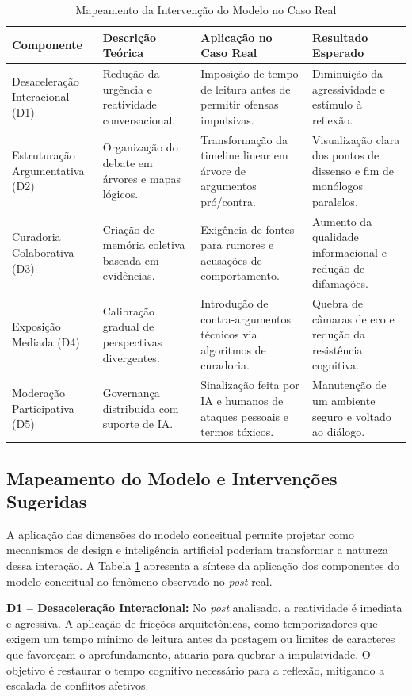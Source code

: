 \documentclass[conference]{IEEEtran} \IEEEoverridecommandlockouts %
\begin{document}
\begin{table}[!htb]
\centering
\caption{Mapeamento da Intervenção do Modelo no Caso Real}
\label{tab:mapeamento}
\small
\begin{tabularx}{\textwidth}{|>{\hsize=0.7\hsize}X|>{\hsize=1.1\hsize}X|>{\hsize=1.1\hsize}X|>{\hsize=1.1\hsize}X|}
\hline
\textbf{Componente} & \textbf{Descrição Teórica} & \textbf{Aplicação no Caso Real} & \textbf{Resultado Esperado} \\ \hline
Desaceleração Interacional (D1) & Redução da urgência e reatividade conversacional. & Imposição de tempo de leitura antes de permitir ofensas impulsivas. & Diminuição da agressividade e estímulo à reflexão. \\ \hline
Estruturação Argumentativa (D2) & Organização do debate em árvores e mapas lógicos. & Transformação da timeline linear em árvore de argumentos pró/contra. & Visualização clara dos pontos de dissenso e fim de monólogos paralelos. \\ \hline
Curadoria Colaborativa (D3) & Criação de memória coletiva baseada em evidências. & Exigência de fontes para rumores e acusações de comportamento. & Aumento da qualidade informacional e redução de difamações. \\ \hline
Exposição Mediada (D4) & Calibração gradual de perspectivas divergentes. & Introdução de contra-argumentos técnicos via algoritmos de curadoria. & Quebra de câmaras de eco e redução da resistência cognitiva. \\ \hline
Moderação Participativa (D5) & Governança distribuída com suporte de IA. & Sinalização feita por IA e humanos de ataques pessoais e termos tóxicos. & Manutenção de um ambiente seguro e voltado ao diálogo. \\ \hline
\end{tabularx}
\end{table}


\subsection{Mapeamento do Modelo e Intervenções Sugeridas}

A aplicação das dimensões do modelo conceitual permite projetar como mecanismos de design e inteligência artificial poderiam transformar a natureza dessa interação. A Tabela \ref{tab:mapeamento} apresenta a síntese da aplicação dos componentes do modelo conceitual ao fenômeno observado no \textit{post} real.


\textbf{D1 -- Desaceleração Interacional:} No \textit{post} analisado, a reatividade é imediata e agressiva. A aplicação de fricções arquitetônicas, como temporizadores que exigem um tempo mínimo de leitura antes da postagem ou limites de caracteres que favoreçam o aprofundamento, atuaria para quebrar a impulsividade. O objetivo é restaurar o tempo cognitivo necessário para a reflexão, mitigando a escalada de conflitos afetivos.
\end{document}
